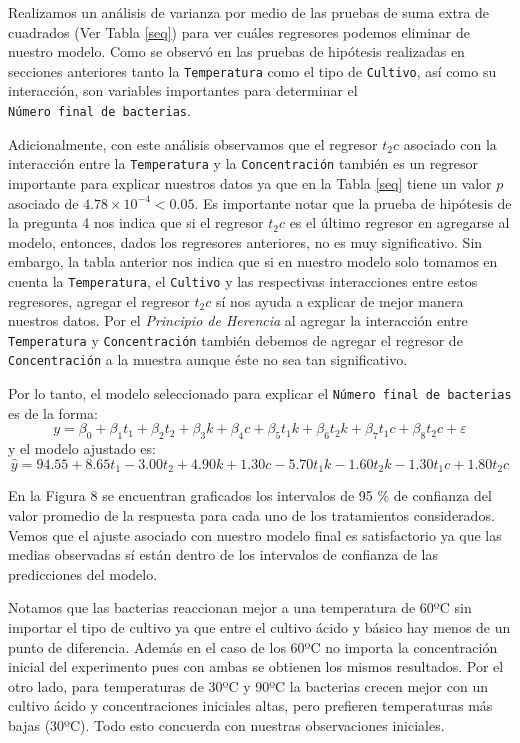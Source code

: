 \documentclass[10pt, spanish]{article}
\begin{document}
    Realizamos un análisis de varianza por medio de las pruebas de suma extra de cuadrados (Ver Tabla \ref{seq}) para ver cuáles regresores podemos
eliminar de nuestro modelo. Como se observó en las pruebas de hipótesis
realizadas en secciones anteriores tanto la \texttt{Temperatura} como
el tipo de \texttt{Cultivo}, así como su interacción, son variables
importantes para determinar el \texttt{Número\ final\ de\ bacterias}.

Adicionalmente, con este análisis observamos que el regresor $t_2c$ asociado con la interacción entre la \texttt{Temperatura} y la \texttt{Concentración} también es un regresor
importante para explicar nuestros datos ya que en la Tabla \ref{seq} tiene un valor $p$ asociado de
\(4.78 \times 10 ^{-4} < 0.05\). Es importante notar que la prueba de
hipótesis de la pregunta 4 nos indica que si el regresor $t_2c$ es el
último regresor en agregarse al modelo, entonces, dados los regresores anteriores, no es muy
significativo. Sin embargo, la tabla anterior nos indica que si en nuestro modelo solo
tomamos en cuenta la \texttt{Temperatura}, el \texttt{Cultivo} y las respectivas interacciones entre estos regresores, agregar el regresor $t_2c$ sí nos ayuda a
explicar de mejor manera nuestros datos. Por el \emph{Principio de
Herencia} al agregar la interacción entre \texttt{Temperatura} y
\texttt{Concentración} también debemos de agregar el regresor de
\texttt{Concentración} a la muestra aunque éste no sea tan
significativo.

    Por lo tanto, el modelo seleccionado para explicar el
\texttt{Número\ final\ de\ bacterias} es de la forma:
\[y=\beta_0 + \beta_1 t_1 + \beta_2 t_2 + \beta_3 k + \beta_4 c + \beta_5 t_1k + \beta_6 t_2k + \beta_7 t_1c + \beta_8 t_2c + \varepsilon\]
y el modelo ajustado es:
\[\hat{y}= 94.55 + 8.65t_1 - 3.00t_2 + 4.90k + 1.30c - 5.70t_1k -1.60t_2k - 1.30t_1c + 1.80t_2c \]

    \begin{center}
    \end{center}


    En la Figura 8 se encuentran graficados los intervalos de 95 \% de confianza del valor promedio de la respuesta para cada uno de los tratamientos considerados. Vemos que el ajuste asociado con nuestro modelo final es satisfactorio ya que las medias observadas sí están dentro de los
intervalos de confianza de las predicciones del modelo.

Notamos que las bacterias reaccionan mejor a una temperatura de 60ºC sin
importar el tipo de cultivo ya que entre el cultivo ácido y básico hay
menos de un punto de diferencia. Además en el caso de los 60ºC no
importa la concentración inicial del experimento pues con ambas se
obtienen los mismos resultados. Por el otro lado, para temperaturas de
30ºC y 90ºC la bacterias crecen mejor con un cultivo ácido y
concentraciones iniciales altas, pero prefieren temperaturas más bajas
(30ºC). Todo esto concuerda con nuestras observaciones iniciales.


\end{document}
